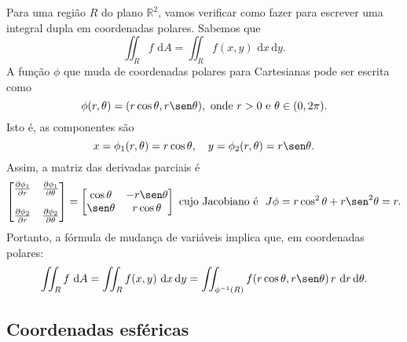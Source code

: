 Para uma região $R$ do plano $\mathbb{R}^2$, vamos verificar como fazer para escrever uma integral dupla em coordenadas polares. Sabemos que
\begin{equation}
\iint_R f \, \, \mathrm{d} A = \iint_R f(x,y) \, \, \mathrm{d} x \, \mathrm{d} y.
\end{equation} A função $\phi$ que muda de coordenadas polares para Cartesianas pode ser escrita como
\begin{equation}
\phi (r, \theta) = (r\cos \theta, r \sen \theta), \text{ onde } r> 0 \text{ e } \theta \in (0,2\pi).
\end{equation} Isto é, as componentes são
\begin{equation}
x = \phi_1 (r, \theta) = r\cos \theta, \quad y = \phi_2 (r, \theta) = r \sen \theta.
\end{equation} Assim, a matriz das derivadas parciais é
\begin{equation}
\begin{bmatrix}
\frac{\partial \phi_1}{\partial r} & \frac{\partial \phi_1}{\partial \theta} \\
& \\
\frac{\partial \phi_2}{\partial r} & \frac{\partial \phi_2}{\partial \theta}
\end{bmatrix} =
\begin{bmatrix}
\cos \theta & -r \sen \theta \\
\sen \theta & r \cos \theta
\end{bmatrix}
 \text{ cujo Jacobiano é } \ J\phi = r \cos^2 \theta + r \sen^2 \theta = r.
\end{equation} Portanto, a fórmula de mudança de variáveis implica que, em coordenadas polares:
\begin{equation}
\iint_R f \, \, \mathrm{d} A = \iint_R f(x,y) \, \, \mathrm{d} x \, \mathrm{d} y = \iint_{\phi^{-1}(R)} f(r\cos \theta, r\sen \theta) \, r \, \, \mathrm{d} r \, \mathrm{d} \theta.
\end{equation}


\subsection{Coordenadas esféricas}

